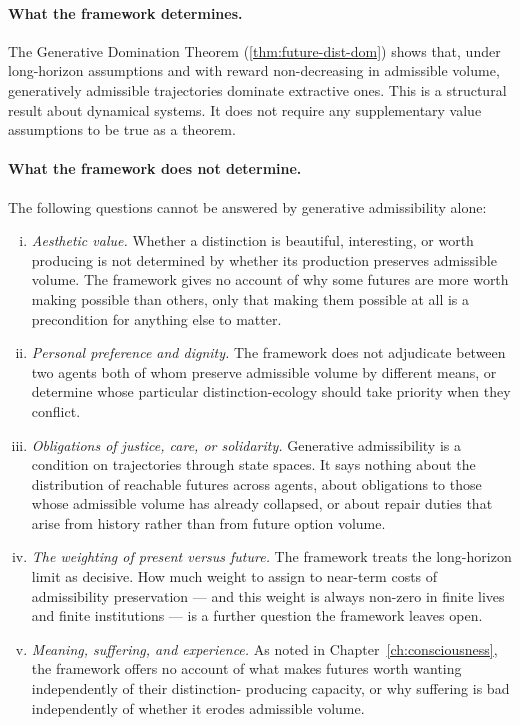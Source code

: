 \documentclass[12pt,twoside,openright]{book}
\begin{document}
\paragraph{What the framework determines.}
The Generative Domination Theorem
(\cref{thm:future-dist-dom}) shows that, under long-horizon
assumptions and with reward non-decreasing in admissible
volume, generatively admissible trajectories dominate
extractive ones. This is a structural result about
dynamical systems. It does not require any supplementary
value assumptions to be true as a theorem.

\paragraph{What the framework does not determine.}
The following questions cannot be answered by generative
admissibility alone:
\begin{enumerate}[(i)]
  \item \emph{Aesthetic value.} Whether a distinction
        is beautiful, interesting, or worth producing is
        not determined by whether its production preserves
        admissible volume. The framework gives no account
        of why some futures are more worth making possible
        than others, only that making them possible at
        all is a precondition for anything else to matter.

  \item \emph{Personal preference and dignity.} The
        framework does not adjudicate between two agents
        both of whom preserve admissible volume by
        different means, or determine whose particular
        distinction-ecology should take priority when
        they conflict.

  \item \emph{Obligations of justice, care, or
        solidarity.} Generative admissibility is a
        condition on trajectories through state spaces.
        It says nothing about the distribution of
        reachable futures across agents, about obligations
        to those whose admissible volume has already
        collapsed, or about repair duties that arise from
        history rather than from future option volume.

  \item \emph{The weighting of present versus future.}
        The framework treats the long-horizon limit as
        decisive. How much weight to assign to near-term
        costs of admissibility preservation --- and this
        weight is always non-zero in finite lives and
        finite institutions --- is a further question the
        framework leaves open.

  \item \emph{Meaning, suffering, and experience.} As
        noted in Chapter~\ref{ch:consciousness}, the
        framework offers no account of what makes futures
        worth wanting independently of their distinction-
        producing capacity, or why suffering is bad
        independently of whether it erodes admissible
        volume.
\end{enumerate}
\end{document}
